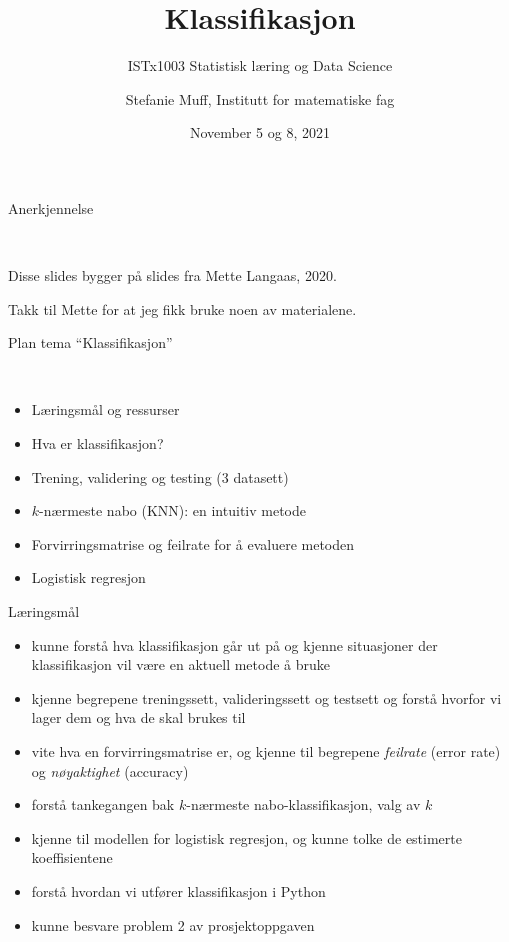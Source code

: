 \documentclass[10pt,ignorenonframetext,]{beamer}
\title{Klassifikasjon}
\subtitle{ISTx1003 Statistisk læring og Data Science}
\author{Stefanie Muff, Institutt for matematiske fag}
\date{November 5 og 8, 2021}
\begin{document}
\frame{\titlepage}

\begin{frame}{Anerkjennelse}
\protect\hypertarget{anerkjennelse}{}

\(~\)

Disse slides bygger på slides fra Mette Langaas, 2020.

Takk til Mette for at jeg fikk bruke noen av materialene.

\end{frame}

\begin{frame}{Plan tema ``Klassifikasjon''}
\protect\hypertarget{plan-tema-klassifikasjon}{}

\(~\)

\begin{itemize}
\item
  Læringsmål og ressurser
\item
  Hva er klassifikasjon?
\item
  Trening, validering og testing (3 datasett)
\item
  \(k\)-nærmeste nabo (KNN): en intuitiv metode
\item
  Forvirringsmatrise og feilrate for å evaluere metoden
\item
  Logistisk regresjon
\end{itemize}

\end{frame}

\begin{frame}{Læringsmål}
\protect\hypertarget{luxe6ringsmuxe5l}{}

\begin{itemize}
\item
  kunne forstå hva klassifikasjon går ut på og kjenne situasjoner der
  klassifikasjon vil være en aktuell metode å bruke
\item
  kjenne begrepene treningssett, valideringssett og testsett og forstå
  hvorfor vi lager dem og hva de skal brukes til
\item
  vite hva en forvirringsmatrise er, og kjenne til begrepene
  \emph{feilrate} (error rate) og \emph{nøyaktighet} (accuracy)
\item
  forstå tankegangen bak \(k\)-nærmeste nabo-klassifikasjon, valg av
  \(k\)
\item
  kjenne til modellen for logistisk regresjon, og kunne tolke de
  estimerte koeffisientene
\item
  forstå hvordan vi utfører klassifikasjon i Python
\item
  kunne besvare problem 2 av prosjektoppgaven
\end{itemize}

\end{frame}
\end{document}
